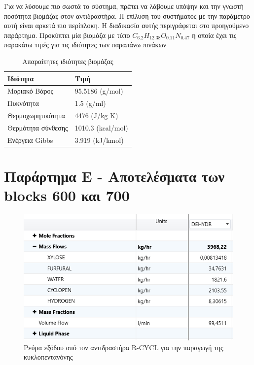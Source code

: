 \documentclass[11pt]{article}
\begin{document}
Για να λύσουμε πιο σωστά το σύστημα, πρέπει να λάβουμε υπόψην και την γνωστή ποσότητα βιομάζας στον αντιδραστήρα. Η επίλυση του συστήματος με την παράμετρο αυτή είναι αρκετά πιο περίπλοκη. Η διαδικασία αυτής περιγράφεται στο προηγούμενο παράρτημα. Προκύπτει μία βιομάζα με τύπο \(C_{6.2}H_{12.38}O_{0.11}N_{0.47}\) η οποία έχει τις παρακάτω τιμές για τις ιδιότητες των παραπάνω πινάκων

\pagebreak

\begin{table}[htbp]
\caption{Απαραίτητες ιδιότητες βιομάζας}
\centering
\begin{tabular}{ll}
Ιδιότητα & Τιμή\\
\hline
Μοριακό Βάρος & 95.5186 (g/mol)\\
Πυκνότητα & 1.5 (g/ml)\\
Θερμοχωρητικότητα & 4476 (J/kg K)\\
Θερμότητα σύνθεσης & 1010.3 (kcal/mol)\\
Ενέργεια Gibbs & 3.919 (kJ/kmol)\\
\end{tabular}
\end{table}

\section{Παράρτημα E - Αποτελέσματα των blocks 600 και 700}
\label{sec:orgd5c0a0f}
\begin{figure}[htbp]
\centering
\includegraphics[width=.9\linewidth]{Παράρτημα/2023-01-13_18-10-03_screenshot.png}
\caption{Ρεύμα εξόδου από τον αντιδραστήρα R-CYCL για την παραγωγή της κυκλοπεντανόνης}
\end{figure}
\end{document}
